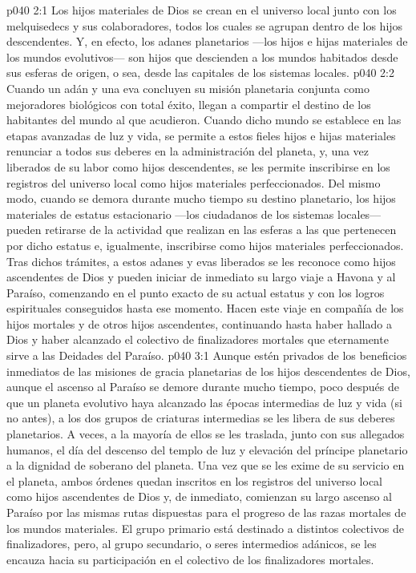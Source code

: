 \vs p040 2:1 Los hijos materiales de Dios se crean en el universo local junto con los melquisedecs y sus colaboradores, todos los cuales se agrupan dentro de los hijos descendentes. Y, en efecto, los adanes planetarios ---los hijos e hijas materiales de los mundos evolutivos--- son hijos que descienden a los mundos habitados desde sus esferas de origen, o sea, desde las capitales de los sistemas locales.
\vs p040 2:2 Cuando un adán y una eva concluyen su misión planetaria conjunta como mejoradores biológicos con total éxito, llegan a compartir el destino de los habitantes del mundo al que acudieron. Cuando dicho mundo se establece en las etapas avanzadas de luz y vida, se permite a estos fieles hijos e hijas materiales renunciar a todos sus deberes en la administración del planeta, y, una vez liberados de su labor como hijos descendentes, se les permite inscribirse en los registros del universo local como hijos materiales perfeccionados. Del mismo modo, cuando se demora durante mucho tiempo su destino planetario, los hijos materiales de estatus estacionario ---los ciudadanos de los sistemas locales--- pueden retirarse de la actividad que realizan en las esferas a las que pertenecen por dicho estatus e, igualmente, inscribirse como hijos materiales perfeccionados. Tras dichos trámites, a estos adanes y evas liberados se les reconoce como hijos ascendentes de Dios y pueden iniciar de inmediato su largo viaje a Havona y al Paraíso, comenzando en el punto exacto de su actual estatus y con los logros espirituales conseguidos hasta ese momento. Hacen este viaje en compañía de los hijos mortales y de otros hijos ascendentes, continuando hasta haber hallado a Dios y haber alcanzado el colectivo de finalizadores mortales que eternamente sirve a las Deidades del Paraíso.
\vs p040 3:1 Aunque estén privados de los beneficios inmediatos de las misiones de gracia planetarias de los hijos descendentes de Dios, aunque el ascenso al Paraíso se demore durante mucho tiempo, poco después de que un planeta evolutivo haya alcanzado las épocas intermedias de luz y vida (si no antes), a los dos grupos de criaturas intermedias se les libera de sus deberes planetarios. A veces, a la mayoría de ellos se les traslada, junto con sus allegados humanos, el día del descenso del templo de luz y elevación del príncipe planetario a la dignidad de soberano del planeta. Una vez que se les exime de su servicio en el planeta, ambos órdenes quedan inscritos en los registros del universo local como hijos ascendentes de Dios y, de inmediato, comienzan su largo ascenso al Paraíso por las mismas rutas dispuestas para el progreso de las razas mortales de los mundos materiales. El grupo primario está destinado a distintos colectivos de finalizadores, pero, al grupo secundario, o seres intermedios adánicos, se les encauza hacia su participación en el colectivo de los finalizadores mortales.
